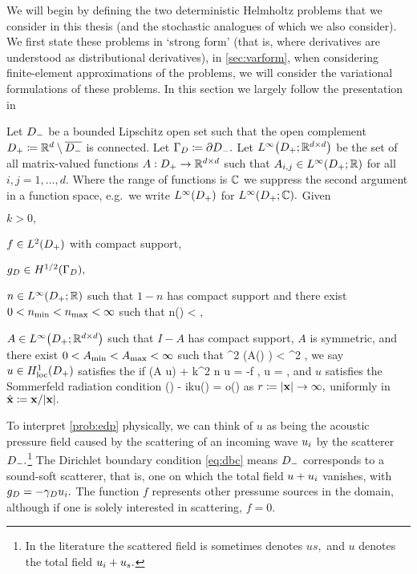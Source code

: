   We will begin by defining the two deterministic Helmholtz problems that we consider in this thesis (and the stochastic analogues of which we also consider). We first state these problems in `strong form' (that is, where derivatives are understood as distributional derivatives), in \cref{sec:varform}, when considering finite-element approximations of the problems, we will consider the variational formulations of these problems. In this section we largely follow the presentation in \cite{GrPeSp:19}

  \label{prob:edp}
  Let $D_{-}$ be a bounded Lipschitz open set such that the open complement $D_{+} \coloneqq \mathbb R^{d} \setminus \overline{D_{-}}$ is connected. Let $\Gamma_{D} \coloneqq \partial D_{-}.$ Let $\LiDpRRdtd$ be the set of all matrix-valued functions $A:D_{+}\rightarrow\mathbb R^{d\times d}$ such that $A_{i,j} \in \LiDpRR$ for all $i,j = 1,\ldots,d.$ Where the range of functions is $\mathbb C$ we suppress the second argument in a function space, e.g.~we write $\LiDp$ for $\LiDpCC.$  Given
  \bit
  \item $k > 0,$
\item $f \in \LtDp$ with compact support,
\item $\gD \in \HhGD,$
\item $n \in \LiDpRR$ such that $1-n$ has compact support and there exist $0 < n_{\min} < n_{\max} < \infty$ such that
  \beqs
\nmin \leq n(\bx) < \nmax \tfae \bx \in \Dp,
  \eeqs
\item $A \in \LiDpRRdtd$ such that $I-A$ has compact support, $A$ is symmetric, and there exist $0 < A_{\min} < A_{\max} < \infty$ such that
  \beqs
\Amin \abs{\bxi}^2 \leq \mleft(A(\bx) \bxi \mright) \cdot \bxibar < \Amax \abs{\bxi}^2 \tfa \bxi \in \CCd \tfae \bx \in \Dp,
  \eeqs
  \eit
  we say $u \in \HolocDp$ satisfies the  if
  \beq\label{eq:hhedp}
\grad \cdot \mleft(A \grad u\mright) + k^2 n u = -f \tin \Dp,
\eeq
\beq\label{eq:dbc}
\trGD u = \gD,
\eeq
and $u$ satisfies the Sommerfeld radiation condition
\beq\label{eq:sommerfeld}
\dudr(\bx) - iku(\bx) = o\mleft(\mright)
\eeq
as $r \de \abs{\bx} \rightarrow \infty,$ uniformly in $\bxhat \de \bx/\abs{\bx}.$
\eprob

To interpret \cref{prob:edp} physically, we can think of $u$ as being the acoustic pressure field caused by the scattering of an incoming wave $u_{i}$ by the scatterer $D_{-}.$\footnote{In the literature the scattered field is sometimes denotes $us,$ and $u$ denotes the total field $u_{i}+ u_{s}.$} The Dirichlet boundary condition \eqref{eq:dbc} means $D_{-}$ corresponds to a sound-soft scatterer, that is, one on which the total field $u + u_{i}$ vanishes, with $g_{D} = - \gamma_{D} u_{i}.$ The function $f$ represents other pressume sources in the domain, although if one is solely interested in scattering, $f=0.$

